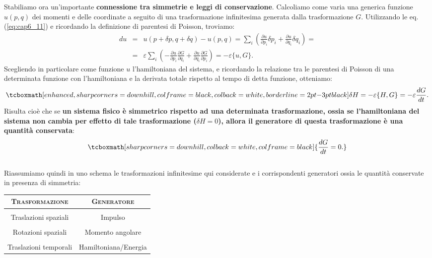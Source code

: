 Stabiliamo ora un'importante \textbf{connessione tra simmetrie e leggi di conservazione}. Calcoliamo come varia una generica funzione $u(p,q)$ dei momenti e delle coordinate a seguito di una trasformazione infinitesima generata dalla trasformazione $G$. Utilizzando le eq. (\ref{eq:cap6_11}) e ricordando la definizione di parentesi di Poisson, troviamo:
	\begin{eqnarray}
		du & = & u(p+\delta p , q+\delta q )- u (p,q) = \sum _i \left( \frac{\partial u}{\partial p_i} \delta p_i + \frac{\partial u}{\partial q_i } \delta q_i \right) = \nonumber \\
		&=& \varepsilon \sum _i \left( -\frac{\partial u}{\partial p_i} \frac{\partial G}{\partial q_i} + \frac{\partial u}{\partial q_i } \frac{\partial G}{\partial p_i} \right) =-\varepsilon \{ u, G \} .
	\end{eqnarray}
Scegliendo in particolare come funzione $u$ l'hamiltoniana del sistema,  e ricordando la relazione tra le parentesi di Poisson di una determinata funzione con l'hamiltoniana e la derivata totale rispetto al tempo di detta funzione, otteniamo:
	\begin{equation}
		\tcboxmath[enhanced, sharp corners=downhill, colframe=black, colback=white, borderline={2pt}{-3pt}{black}]{
			\delta H = -\varepsilon \{H,G\} = -\varepsilon \frac{dG}{dt}.
			}
	\end{equation}
Risulta cioè che se \textbf{un sistema fisico è simmetrico rispetto ad una determinata trasformazione, ossia se l'hamiltoniana del sistema non cambia per effetto di tale trasformazione ($\delta H =0$), allora il generatore di questa trasformazione è una quantità conservata}:
	\begin{equation}
		\tcboxmath[sharp corners=downhill, colback=white, colframe=black]{
			\frac{dG}{dt}=0.
			}
	\end{equation}\\
	
Riassumiamo quindi in uno schema le trasformazioni infinitesime qui considerate e i corrispondenti generatori ossia le quantità conservate in presenza di simmetria:

\begin{table}[!htbp]
\begin{center}
\begin{tabular}{c|c}
\textbf{\textsc{Trasformazione}} & \textbf{\textsc{Generatore}}\\
\hline \\
Traslazioni spaziali & Impulso \\
\hline \\
Rotazioni spaziali & Momento angolare \\
\hline \\
Traslazioni temporali &  Hamiltoniana/Energia \\
\hline 
\end{tabular}
\end{center}
\end{table}
